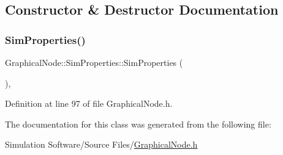 \subsection{Constructor \& Destructor Documentation}
\mbox{\label{class_graphical_node_1_1_sim_properties_a86292c6d408d98917272ddcd47264eaa}} 
\subsubsection{\texorpdfstring{Sim\+Properties()}{SimProperties()}}
{\footnotesize\ttfamily Graphical\+Node\+::\+Sim\+Properties\+::\+Sim\+Properties (\begin{DoxyParamCaption}{ }\end{DoxyParamCaption})\hspace{0.3cm}{\ttfamily [inline]}, {\ttfamily [protected]}}



Definition at line 97 of file Graphical\+Node.\+h.



The documentation for this class was generated from the following file\+:\begin{DoxyCompactItemize}
\item 
Simulation Software/\+Source Files/\hyperlink{_graphical_node_8h}{Graphical\+Node.\+h}\end{DoxyCompactItemize}
